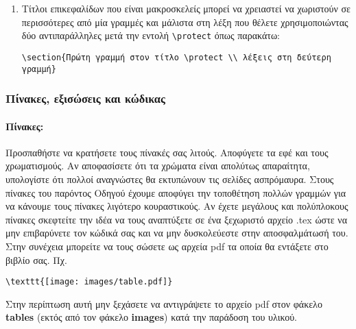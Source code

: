 \begin{refsection}
\begin{enumerate}
\begin{verbatim}
\section[Αυτή η εκδοχή του τίτλου θα εμφανιστεί στον πίνακα περιεχομένων]
{Αυτή η εκδοχή θα εμφανίζεται σαν επικεφαλίδα στο τμήμα του κεφαλαίου}
\end{verbatim}
\item Τίτλοι επικεφαλίδων που είναι μακροσκελείς μπορεί να χρειαστεί να χωριστούν σε περισσότερες από μία
γραμμές και μάλιστα στη λέξη που θέλετε χρησιμοποιώντας δύο αντιπαράλληλες μετά την εντολή \verb=\protect= όπως παρακάτω:
\begin{verbatim}
\section{Πρώτη γραμμή στον τίτλο \protect \\ λέξεις στη δεύτερη γραμμή}
\end{verbatim}
\end{enumerate}
\vspace{3mm}
\subsubsection{Πίνακες, εξισώσεις και κώδικας}\label{subsub:tables}
\paragraph{Πίνακες:}
Προσπαθήστε να κρατήσετε τους πίνακές σας λιτούς. Αποφύγετε τα εφέ και τους χρωματισμούς. Αν αποφασίσετε
ότι τα χρώματα είναι απολύτως απαραίτητα, υπολογίστε ότι πολλοί αναγνώστες θα εκτυπώνουν τις σελίδες
ασπρόμαυρα. Στους πίνακες του παρόντος Οδηγού έχουμε αποφύγει την τοποθέτηση πολλών γραμμών για να
κάνουμε τους πίνακες λιγότερο κουραστικούς. Αν έχετε μεγάλους και πολύπλοκους πίνακες σκεφτείτε την ιδέα να
τους αναπτύξετε σε ένα ξεχωριστό αρχείο .tex ώστε να μην επιβαρύνετε τον κώδικά σας και να μην δυσκολεύεστε
στην αποσφαλμάτωσή του. Στην συνέχεια μπορείτε να τους σώσετε ως αρχεία pdf τα οποία θα εντάξετε
στο βιβλίο σας. Πχ.
\begin{verbatim}
\texttt{[image: images/table.pdf]}
\end{verbatim}
Στην περίπτωση αυτή μην ξεχάσετε να αντιγράψετε το αρχείο pdf στον φάκελο \textbf{tables} (εκτός από τον φάκελο \textbf{images}) κατά την παράδοση του υλικού.

\end{refsection}
